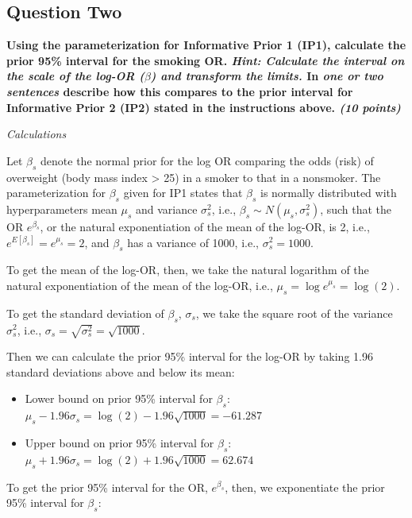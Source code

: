 \documentclass[
  11pt,
]{article}
\begin{document}
\pagebreak

\hypertarget{question-two}{%
\subsection{Question Two}\label{question-two}}

\textbf{Using the parameterization for Informative Prior 1 (IP1), calculate the prior 95\% interval for the smoking OR. \textit{Hint: Calculate the interval on the scale of the log-OR ($\beta$) and transform the limits.} In \textit{one or two sentences} describe how this compares to the prior interval for Informative Prior 2 (IP2) stated in the instructions above. \textit{(10 points)}}

\textit{Calculations}

Let \(\beta_s\) denote the normal prior for the log OR comparing the
odds (risk) of overweight (body mass index \textgreater{} 25) in a
smoker to that in a nonsmoker. The parameterization for \(\beta_s\)
given for IP1 states that \(\beta_s\) is normally distributed with
hyperparameters mean \(\mu_s\) and variance \(\sigma^2_s\), i.e.,
\(\beta_s \sim N(\mu_s, \sigma^2_s)\), such that the OR \(e^{\beta_s}\),
or the natural exponentiation of the mean of the log-OR, is 2, i.e.,
\(e^{E[\beta_s]} = e^{\mu_s} = 2\), and \(\beta_s\) has a variance of
1000, i.e., \(\sigma^2_s = 1000\).

To get the mean of the log-OR, then, we take the natural logarithm of
the natural exponentiation of the mean of the log-OR, i.e.,
\(\mu_s = \log{e^{\mu_{s}}} = \log(2)\).

To get the standard deviation of \(\beta_s\), \(\sigma_s\), we take the
square root of the variance \(\sigma^2_s\), i.e.,
\(\sigma_s = \sqrt{\sigma^2_s} = \sqrt{1000}\).

Then we can calculate the prior 95\% interval for the log-OR by taking
1.96 standard deviations above and below its mean:

\begin{itemize}
\setlength\itemsep{0em}
\item Lower bound on prior 95\% interval for $\beta_s$: $\mu_s - 1.96\sigma_s = \log(2) - 1.96\sqrt{1000} = -61.287$
\item Upper bound on prior 95\% interval for $\beta_s$: $\mu_s + 1.96\sigma_s = \log(2) + 1.96\sqrt{1000} = 62.674$
\end{itemize}

To get the prior 95\% interval for the OR, \(e^{\beta_s}\), then, we
exponentiate the prior 95\% interval for \(\beta_s\):
\end{document}
